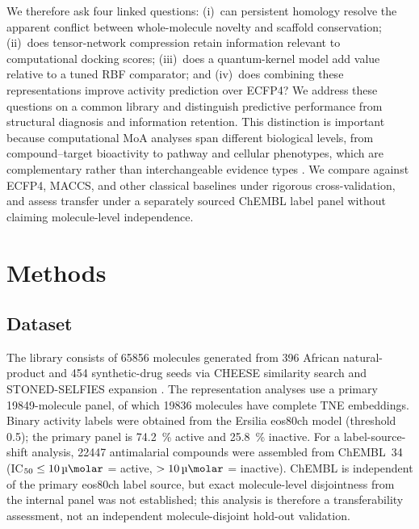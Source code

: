 \documentclass[11pt,a4paper]{article}
\providecommand{\DIFaddbegin}{} %
\providecommand{\DIFaddend}{} %
\newcommand{\DIFaddincludegraphics}[2][]{{\color{blue}\fbox{\DIFOincludegraphics[#1]{#2}}}} %
\DeclareRobustCommand{\DIFaddbegin}{\DIFOaddbegin \let\includegraphics\DIFaddincludegraphics} %
\DeclareRobustCommand{\DIFaddend}{\DIFOaddend \let\includegraphics\DIFOincludegraphics} %
\begin{document}
We therefore ask four linked questions: (i)~can persistent homology resolve the apparent conflict between whole-molecule novelty and scaffold conservation; (ii)~does tensor-network compression retain information relevant to computational docking scores; (iii)~does a quantum-kernel model add value relative to a tuned RBF comparator; and (iv)~does combining these representations improve activity prediction over ECFP4? We address these questions on a common library and distinguish predictive performance from structural diagnosis and information retention. This distinction is important because computational MoA analyses span different biological levels, from compound--target bioactivity to pathway and cellular phenotypes, which are complementary rather than interchangeable evidence types \citep{Trapotsi2022MoA}. We compare against ECFP4, MACCS, and other classical baselines under rigorous cross-validation, and assess transfer under a separately sourced ChEMBL label panel without claiming molecule-level independence.


\section{Methods}\DIFaddbegin \label{sec:methods}
\DIFaddend 

\subsection{Dataset}\DIFaddbegin \label{sec:methods_dataset}
\DIFaddend 

The library consists of \num{65856} molecules generated from \num{396} African natural-product and \num{454} synthetic-drug seeds via CHEESE similarity search \citep{lzicar_cheese_2024} and STONED-SELFIES expansion \citep{Nigam2021}. The representation analyses use a primary \num{19849}-molecule panel, of which \num{19836} molecules have complete TNE embeddings. Binary activity labels were obtained from the Ersilia eos80ch model (threshold \num{0.5}); the primary panel is \qty{74.2}{\percent} active and \qty{25.8}{\percent} inactive. For a label-source-shift analysis, \num{22447} antimalarial compounds were assembled from ChEMBL~34 (IC$_{50} \leq \SI{10}{\micro\molar}$ = active, $> \SI{10}{\micro\molar}$ = inactive). ChEMBL is independent of the primary eos80ch label source, but exact molecule-level disjointness from the internal panel was not established; this analysis is therefore a transferability assessment, not an independent molecule-disjoint hold-out validation.
\end{document}

